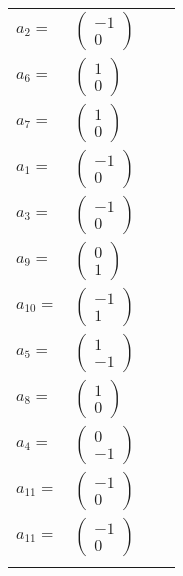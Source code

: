 \documentclass[1p]{elsarticle_modified}
\theoremstyle{definition}
\begin{document}
\begin{tabular}{m{7pt} m{180pt} m{7pt} m{180pt} }
\flushright $a_{2}=$&$\begin{pmatrix}-1\\0\end{pmatrix}$ \\
\flushright $a_{6}=$&$\begin{pmatrix}1\\0\end{pmatrix}$ \\
\flushright $a_{7}=$&$\begin{pmatrix}1\\0\end{pmatrix}$ \\
\flushright $a_{1}=$&$\begin{pmatrix}-1\\0\end{pmatrix}$ \\
\flushright $a_{3}=$&$\begin{pmatrix}-1\\0\end{pmatrix}$ \\
\flushright $a_{9}=$&$\begin{pmatrix}0\\1\end{pmatrix}$ \\
\flushright $a_{10}=$&$\begin{pmatrix}-1\\1\end{pmatrix}$ \\
\flushright $a_{5}=$&$\begin{pmatrix}1\\-1\end{pmatrix}$ \\
\flushright $a_{8}=$&$\begin{pmatrix}1\\0\end{pmatrix}$ \\
\flushright $a_{4}=$&$\begin{pmatrix}0\\-1\end{pmatrix}$ \\
\flushright $a_{11}=$&$\begin{pmatrix}-1\\0\end{pmatrix}$\\ \flushright $a_{11}=$&$\begin{pmatrix}-1\\0\end{pmatrix}$\\&\end{tabular}
\end{document}
